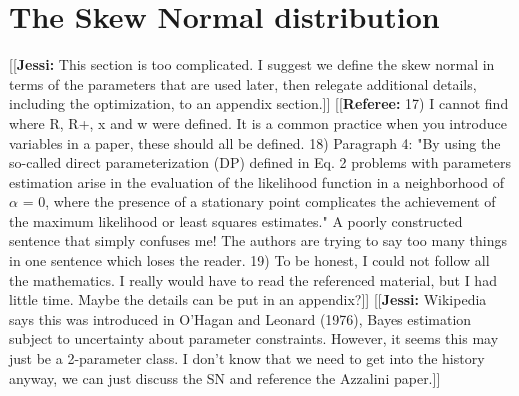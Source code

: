 \documentclass[11pt, oneside]{article}
\newcommand{\jessi}[1]{{\color{Purple}[[\textbf{Jessi: }#1]]}}
\newcommand{\comment}[1]{{\color{red}[[\textbf{Referee: }#1]]}}
\begin{document}
%

\section{The Skew Normal distribution} \label{sec:2}
\jessi{This section is too complicated.  I suggest we define the skew normal in terms of the parameters that are used later, then relegate additional details, including the optimization, to an appendix section.}
\comment{17) I cannot find where R, R+, x and w were defined. It is a common practice when you introduce variables in a paper, these should all be defined.
18) Paragraph 4: "By using the so-called direct parameterization (DP) defined in Eq. 2 problems with parameters estimation arise in the evaluation of the likelihood function in a neighborhood of $\alpha$ = 0, where the presence of a stationary point complicates the achievement of the maximum likelihood or least squares estimates."
A poorly constructed sentence that simply confuses me! The authors are trying to say too many things in one sentence which loses the reader.
19) To be honest, I could not follow all the mathematics. I really would have to read the referenced material, but I had little time. Maybe the details can be put in an appendix?}
\jessi{Wikipedia says this was introduced in O'Hagan and Leonard (1976), Bayes estimation subject to uncertainty about parameter constraints.  However, it seems this may just be a 2-parameter class. I don't know that we need to get into the history anyway, we can just discuss the SN and reference the Azzalini paper.}
\end{document}
